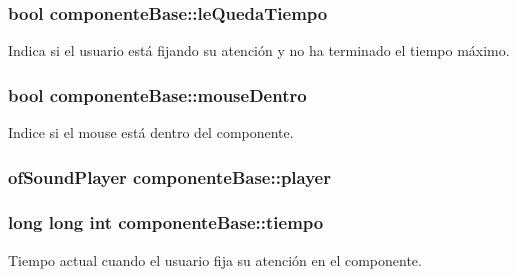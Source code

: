 \subsubsection[{le\+Queda\+Tiempo}]{\setlength{\rightskip}{0pt plus 5cm}bool componente\+Base\+::le\+Queda\+Tiempo\hspace{0.3cm}{\ttfamily [protected]}}\label{classcomponente_base_ab03e8ff7fb596e34738ba00d455e37f5}


Indica si el usuario está fijando su atención y no ha terminado el tiempo máximo. 

\hypertarget{classcomponente_base_a3cd688b2120c9545e25b490911e66717}{}
\subsubsection[{mouse\+Dentro}]{\setlength{\rightskip}{0pt plus 5cm}bool componente\+Base\+::mouse\+Dentro\hspace{0.3cm}{\ttfamily [protected]}}\label{classcomponente_base_a3cd688b2120c9545e25b490911e66717}


Indice si el mouse está dentro del componente. 

\hypertarget{classcomponente_base_aed6af391c3e1381467f804283925ede1}{}
\subsubsection[{player}]{\setlength{\rightskip}{0pt plus 5cm}of\+Sound\+Player componente\+Base\+::player\hspace{0.3cm}{\ttfamily [protected]}}\label{classcomponente_base_aed6af391c3e1381467f804283925ede1}
\hypertarget{classcomponente_base_a6c1aa628629954f831209628e3dfcb2b}{}
\subsubsection[{tiempo}]{\setlength{\rightskip}{0pt plus 5cm}long long int componente\+Base\+::tiempo\hspace{0.3cm}{\ttfamily [protected]}}\label{classcomponente_base_a6c1aa628629954f831209628e3dfcb2b}


Tiempo actual cuando el usuario fija su atención en el componente. 

